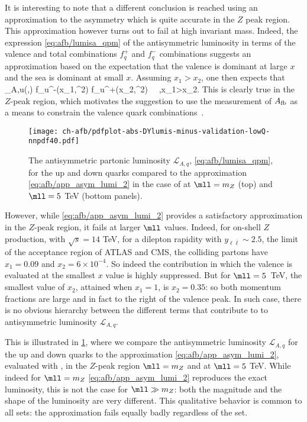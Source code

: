 It is interesting to note that a different conclusion is reached using
an approximation to the asymmetry which is quite accurate  in the $Z$
peak region.
%
This approximation however turns out to fail at high
invariant mass.
%
Indeed, the expression \cref{eq:afb/lumisa_qpm} of the antisymmetric
luminosity in terms of the valence 
and total \pdf combinations $f_q^+$ and $f_q^-$ \pdf combinations
suggests an approximation based on the expectation
that the valence is dominant at large $x$ and the sea is dominant at
small $x$. Assuming $x_1> x_2$, one then expects that
\be
{}_{A,u}(\yll,\mll) \approx{} f_u^-(x_1,\mll^2)
f_{u}^+(x_2,\mll^2)   \,  \, ,\quad x_1>x_2.
\label{eq:afb/app_asym_lumi_2}
\ee
This is clearly true  in the $Z$-peak region, which  motivates the
suggestion to use the measurement of $A_{\rm fb}$ as a means to
 constrain the valence quark combinations~\cite{Accomando:2019vqt}.

\begin{figure}[!t]
 \centering
 \texttt{[image: ch-afb/pdfplot-abs-DYlumis-minus-validation-lowQ-nnpdf40.pdf]}
 \caption{The  antisymmetric partonic luminosity $\mathcal{L}_{A,q}$, \cref{eq:afb/lumisa_qpm},
for the up and down quarks 
compared to the approximation 
\cref{eq:afb/app_asym_lumi_2} in the case of 
at $\mll=m_Z$ (top)
and $\mll=5$ TeV (bottom panels).
 }    
 \label{fig:afb/pdfplot-abs-DYlumis-minus-validation-lowQ-nnpdf40}
\end{figure}

However, while \cref{eq:afb/app_asym_lumi_2} provides
a satisfactory approximation in the  $Z$-peak region,
it fails  at larger $\mll$ values. Indeed, for on-shell $Z$
production, with $\sqrt{s}=14$ TeV,
for a dilepton rapidity with $y_{\ell\bar{\ell}}\sim 2.5$, the limit of the
acceptance region
of ATLAS and CMS, the colliding partons have
$x_1=0.09$ and $x_2=6\times 10^{-4}$. So indeed the contribution in
which the valence \pdf is evaluated at the smallest $x$ value is highly suppressed.
%
But for $\mll=5$~TeV, the smallest value of $x_2$, attained when
$x_1=1$, is $x_2=0.35$: so both momentum fractions are large and in fact
to the right of the valence peak.
%
In such case, there 
is no obvious hierarchy between
the different terms that contribute to to antisymmetric
luminosity $\mathcal{L}_{A,q}$.

This is illustrated in
\cref{fig:afb/pdfplot-abs-DYlumis-minus-validation-lowQ-nnpdf40},
where we compare the antisymmetric luminosity $\mathcal{L}_{A,q}$
for the up and down quarks 
to the approximation
\cref{eq:afb/app_asym_lumi_2}, evaluated with  \nnlo,
in the $Z$-peak region $\mll=m_Z$ 
and at $\mll=5$ TeV.
%
While indeed for $\mll=m_Z$ \cref{eq:afb/app_asym_lumi_2} reproduces
the exact luminosity, this is not the case for $\mll\gg m_Z$: both
the magnitude and the shape of the luminosity are  very different.
%
This qualitative behavior is common to all \pdf sets: the approximation
fails equally badly regardless of the \pdf set.

